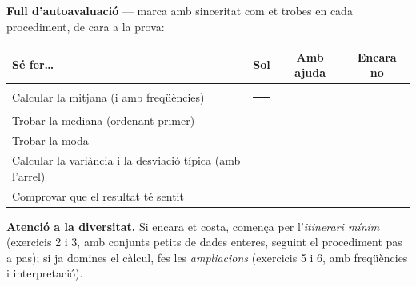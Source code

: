 \begin{idea}
\textbf{Full d'autoavaluació} — marca amb sinceritat com et trobes en cada
procediment, de cara a la prova:
\begin{center}
\renewcommand{\arraystretch}{1.4}
\begin{tabular}{p{8.2cm} c c c}
\toprule
\textbf{Sé fer\dots} & \textbf{Sol} & \textbf{Amb ajuda} & \textbf{Encara no} \\
\midrule
Calcular la mitjana (i amb freqüències) & \rule{0.7cm}{0pt} & & \\
Trobar la mediana (ordenant primer) & & & \\
Trobar la moda & & & \\
Calcular la variància i la desviació típica (amb l'arrel) & & & \\
Comprovar que el resultat té sentit & & & \\
\bottomrule
\end{tabular}
\end{center}
\end{idea}

\noindent\textbf{Atenció a la diversitat.} Si encara et costa, comença per
l'\emph{itinerari mínim} (exercicis 2 i 3, amb conjunts petits de dades enteres,
seguint el procediment pas a pas); si ja domines el càlcul, fes les
\emph{ampliacions} (exercicis 5 i 6, amb freqüències i interpretació).

